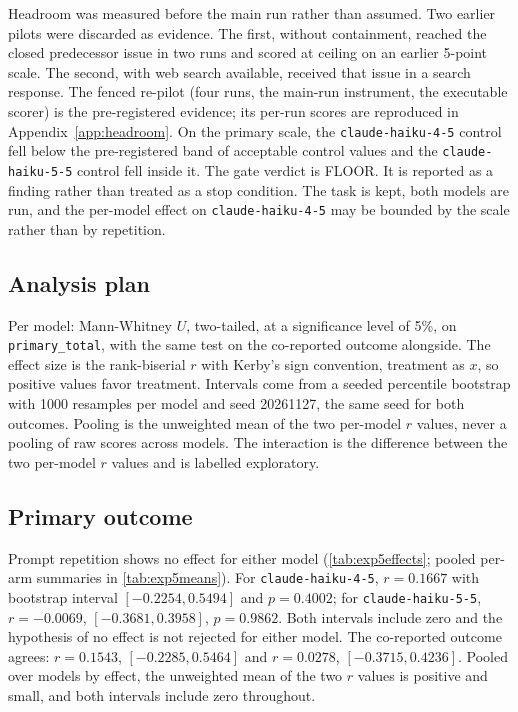 \documentclass[11pt,a4paper]{article}
\begin{document}
Headroom was measured before the main run rather than assumed.
Two earlier pilots were discarded as evidence.
The first, without containment, reached the closed predecessor issue in two runs and scored at ceiling on an earlier 5-point scale.
The second, with web search available, received that issue in a search response.
The fenced re-pilot (four runs, the main-run instrument, the executable scorer) is the pre-registered evidence; its per-run scores are reproduced in Appendix~\ref{app:headroom}.
On the primary scale, the \texttt{claude-haiku-4-5} control fell below the pre-registered band of acceptable control values and the \texttt{claude-haiku-5-5} control fell inside it.
The gate verdict is FLOOR.
It is reported as a finding rather than treated as a stop condition. The task is kept, both models are run, and the per-model effect on \texttt{claude-haiku-4-5} may be bounded by the scale rather than by repetition.

\subsection{Analysis plan}

Per model: Mann-Whitney $U$, two-tailed, at a significance level of 5\%, on \texttt{primary\_total}, with the same test on the co-reported outcome alongside.
The effect size is the rank-biserial $r$ with Kerby's sign convention, treatment as $x$, so positive values favor treatment.
Intervals come from a seeded percentile bootstrap with 1000 resamples per model and seed 20261127, the same seed for both outcomes.
Pooling is the unweighted mean of the two per-model $r$ values, never a pooling of raw scores across models.
The interaction is the difference between the two per-model $r$ values and is labelled exploratory.

\subsection{Primary outcome}
\label{subsec:exp5results}

Prompt repetition shows no effect for either model (\autoref{tab:exp5effects}; pooled per-arm summaries in \autoref{tab:exp5means}).
For \texttt{claude-haiku-4-5}, $r{=}0.1667$ with bootstrap interval $[-0.2254, 0.5494]$ and $p{=}0.4002$; for \texttt{claude-haiku-5-5}, $r{=}-0.0069$, $[-0.3681, 0.3958]$, $p{=}0.9862$.
Both intervals include zero and the hypothesis of no effect is not rejected for either model.
The co-reported outcome agrees: $r{=}0.1543$, $[-0.2285, 0.5464]$ and $r{=}0.0278$, $[-0.3715, 0.4236]$.
Pooled over models by effect, the unweighted mean of the two $r$ values is positive and small, and both intervals include zero throughout.
\end{document}
